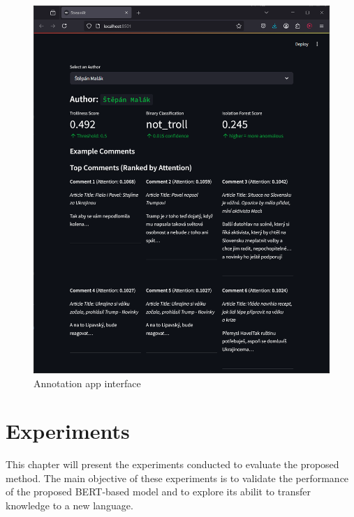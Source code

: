 \documentclass[twoside]{ctuthesis}
\theoremstyle{plain}
\theoremstyle{definition}
\theoremstyle{note}
\begin{document}
\begin{figure}[htbp]          
	\centering                 
	\includegraphics[scale=0.43]{figures/streamlit_app.png}
	\caption{Annotation app interface}    
	\label{fig:my_app}          
\end{figure}

\chapter{Experiments}

This chapter will present the experiments conducted to evaluate the proposed method. The main objective of these experiments is to validate the performance of the proposed BERT-based model and to explore its abilit to transfer knowledge to a new language.\par
\end{document}
